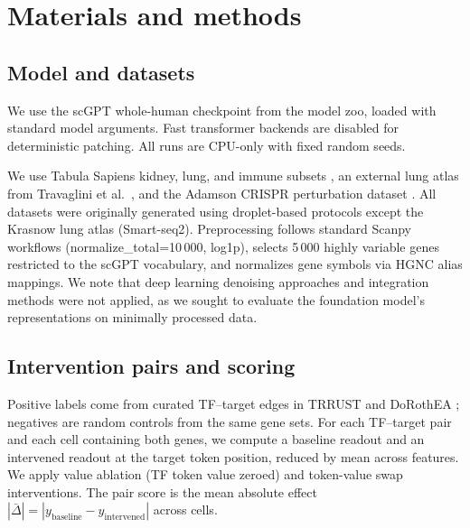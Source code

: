 \documentclass[10pt,letterpaper]{article}
\begin{document}

\section*{Materials and methods}

\subsection*{Model and datasets}

We use the scGPT whole-human checkpoint from the model zoo, loaded with
standard model arguments. Fast transformer backends are disabled for
deterministic patching. All runs are CPU-only with fixed random seeds.

We use Tabula Sapiens kidney, lung, and immune subsets
\cite{tabula_sapiens_2022}, an external lung atlas from
Travaglini et al.\ \cite{travaglini_lung_2020}, and the Adamson CRISPR
perturbation dataset \cite{adamson_dataverse_2022}. All datasets were
originally generated using droplet-based protocols
\cite{zheng_10x_2017} except the Krasnow lung atlas (Smart-seq2).
Preprocessing follows standard Scanpy \cite{wolf_scanpy_2018} workflows
(normalize\_total=10\,000, log1p), selects 5\,000 highly variable genes
restricted to the scGPT vocabulary, and normalizes gene symbols via HGNC alias
mappings. We note that deep learning denoising approaches
\cite{eraslan_sc_review_2019} and integration methods
\cite{stuart_seurat_2019} were not applied, as we sought to evaluate the
foundation model's representations on minimally processed data.

\subsection*{Intervention pairs and scoring}

Positive labels come from curated TF--target edges in TRRUST \cite{han_trrust_2015}
and DoRothEA \cite{dorothea_github}; negatives are random controls from the same gene sets.
For each TF--target pair and each cell containing both genes, we compute a baseline readout and an
intervened readout at the target token position, reduced by mean across
features. We apply value ablation (TF token value zeroed) and token-value swap
interventions. The pair score is the mean absolute effect
$|\bar{\Delta}| = |y_{\text{baseline}} - y_{\text{intervened}}|$ across cells.
\end{document}
